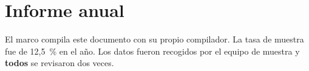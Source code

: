 \documentclass{memoria}
\begin{document}
\section{Informe anual}
El marco compila este documento con su propio compilador.
La tasa de muestra fue de 12,5~\% en el año.
Los datos fueron recogidos por el equipo de muestra y {\bf todos} se revisaron dos veces.
\end{document}
